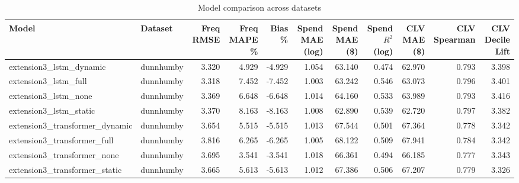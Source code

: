 \begin{table}
\caption{Model comparison across datasets}
\label{tab:model_comparison}
\begin{tabular}{llrrrrrrrrr}
\toprule
Model & Dataset & Freq RMSE & Freq MAPE \% & Bias \% & Spend MAE (log) & Spend MAE (\$) & Spend $R^2$ (log) & CLV MAE (\$) & CLV Spearman & CLV Decile Lift \\
\midrule
extension3_lstm_dynamic & dunnhumby & 3.320 & 4.929 & -4.929 & 1.054 & 63.140 & 0.474 & 62.970 & 0.793 & 3.398 \\
extension3_lstm_full & dunnhumby & 3.318 & 7.452 & -7.452 & 1.003 & 63.242 & 0.546 & 63.073 & 0.796 & 3.401 \\
extension3_lstm_none & dunnhumby & 3.369 & 6.648 & -6.648 & 1.014 & 64.160 & 0.533 & 63.989 & 0.793 & 3.416 \\
extension3_lstm_static & dunnhumby & 3.370 & 8.163 & -8.163 & 1.008 & 62.890 & 0.539 & 62.720 & 0.797 & 3.382 \\
extension3_transformer_dynamic & dunnhumby & 3.654 & 5.515 & -5.515 & 1.013 & 67.544 & 0.501 & 67.364 & 0.778 & 3.342 \\
extension3_transformer_full & dunnhumby & 3.816 & 6.265 & -6.265 & 1.005 & 68.122 & 0.509 & 67.941 & 0.784 & 3.342 \\
extension3_transformer_none & dunnhumby & 3.695 & 3.541 & -3.541 & 1.018 & 66.361 & 0.494 & 66.185 & 0.777 & 3.343 \\
extension3_transformer_static & dunnhumby & 3.665 & 5.613 & -5.613 & 1.012 & 67.386 & 0.506 & 67.207 & 0.779 & 3.326 \\
\bottomrule
\end{tabular}
\end{table}
